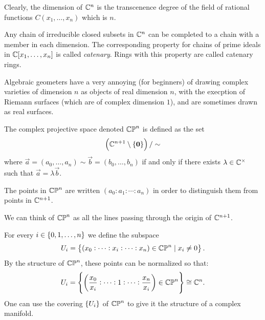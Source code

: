 \documentclass[11pt,a4paper]{article}
\begin{document}
\begin{example}
  Clearly, the dimension of $\mathbb{C}^n$ is the transcenence degree of the field
  of rational functions $C(x_1,\dots,x_n)$ which is $n$.
\end{example}

\begin{remark}
  Any chain of irreducible closed subsets in $\mathbb{C}^n$
  can be completed to a chain with a member in each dimension.
  The corresponding property for chains of prime ideals in $\mathbb{C}[x_1,\dots,x_n]$
  is called \textit{catenary}.
  Rings with this property are called catenary rings.
\end{remark}

\begin{remark}
  Algebraic geometers have a very annoying (for beginners) of drawing complex
  varieties of dimension $n$ as objects of real dimension $n$,
  with the execption of Riemann surfaces (which are of complex dimension $1$),
  and are sometimes drawn as real surfaces.
\end{remark}

\begin{definition}
  The complex projective space denoted $\mathbb{CP}^n$ is defined as the set
  \[
    \del{\C^{n + 1} \setminus \set{\vec 0}} / \sim
  \]
  where $\vec a = (a_0,\dots,a_n) \sim \vec b = (b_0,\dots,b_n)$ if and only if
  there exists $\lambda \in \mathbb{C}^{\times}$ such that $\vec a = \lambda \vec b$.
\end{definition}
\begin{remark}
  The points in $\mathbb{CP}^n$ are written $(a_0 : a_1 : \cdots : a_n)$
  in order to distinguish them from points in $\mathbb{C}^{n+1}$.
\end{remark}

\begin{remark}
  We can think of $\mathbb{CP}^n$ as all the lines passing through the origin
  of $\mathbb{C}^{n+1}$.
\end{remark}

\begin{remark}
  For every $i \in \left\{0,1,\dots,n\right\}$ we define the subspace
  \[
    U_i = \left\{(x_0 : \cdots : x_i : \cdots : x_n) \in \mathbb{CP}^n \mid x_i \neq 0\right\}.
  \]
  By the structure of $\mathbb{CP}^n$, these points can be normalized so that:
  \[
    U_i =
    \left\{\left(\frac{x_0}{x_i} : \cdots : 1 : \cdots : \frac{x_n}{x_i}\right)
      \in \mathbb{CP}^n\right\} \cong \mathbb{C}^n.
  \]
  One can use the covering $\left\{U_i\right\}$ of $\mathbb{CP}^n$ to give it
  the structure of a complex manifold.
\end{remark}
\end{document}
